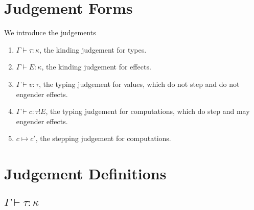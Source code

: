 \documentclass[12pt]{article}
\begin{document}
\newpage
\section{Judgement Forms}

We introduce the judgements
\begin{enumerate}
\item $\Gamma \vdash \tau : \kappa$, the kinding judgement for types.
\item $\Gamma \vdash E : \kappa$, the kinding judgement for effects.
\item $\Gamma \vdash v : \tau$, the typing judgement for values, which do not
step and do not engender effects.
\item $\Gamma \vdash c : \tau!E$, the typing judgement for computations, which
do step and may engender effects.
\item $c \mapsto c'$, the stepping judgement for computations.
\end{enumerate}

\newpage
\section{Judgement Definitions}

\subsection{$\Gamma \vdash \tau : \kappa$}
\end{document}
